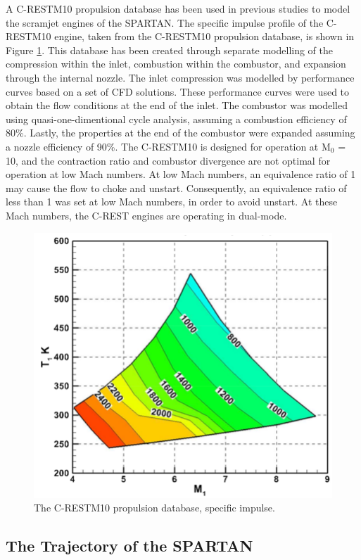 A C-RESTM10 propulsion database has been used in previous studies to model the scramjet engines of the SPARTAN\cite{Preller2017b}. The specific impulse profile of the C-RESTM10 engine, taken from the C-RESTM10 propulsion database, is shown in Figure \ref{fig:C-REST}. This database has been created through separate modelling of the compression within the inlet, combustion within the combustor, and expansion through the internal nozzle\cite{Preller2018a}. The inlet compression was modelled by performance curves based on a set of CFD solutions\cite{Preller2018a}. These performance curves were used to obtain the flow conditions at the end of the inlet. The combustor was modelled using quasi-one-dimentional cycle analysis, assuming a combustion efficiency of 80\%\cite{Preller2018a}. Lastly, the properties at the end of the combustor were expanded assuming a nozzle efficiency of 90\%\cite{Preller2018a}.
The C-RESTM10 is designed for operation at M$_0$ = 10, and the contraction ratio and combustor divergence are not optimal for operation at low Mach numbers. At low Mach numbers, an equivalence ratio of 1 may cause the flow to choke and unstart. 
Consequently, an equivalence ratio of less than 1 was set at low Mach numbers, in order to avoid unstart\cite{Preller2018a}. At these Mach numbers, the C-REST engines are operating in dual-mode\cite{Preller2018a}. 


\begin{figure}
	\centering
	\includegraphics[width=0.7\linewidth]{figures/2_literature-review/C-REST}
	\caption{The C-RESTM10 propulsion database, specific impulse.}
	\label{fig:C-REST}
\end{figure}




\subsection{The Trajectory of the SPARTAN}

